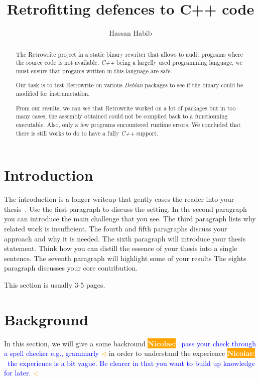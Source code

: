 \documentclass[a4paper,11pt,oneside]{report}
\title{Retrofitting defences to C++ code}
\author{Hassan Habib}
\newcommand{\sysname}{Retrowrite\xspace}
\newcommand{\todobox}[3]{%
    \colorbox{#1}{\textcolor{white}{\sffamily\bfseries\scriptsize #2}}%
    ~\textcolor{blue}{#3} %
    \textcolor{#1}{$\triangleleft$}%
}
\newcommand{\nb}[1]{\todobox{orange}{Nicolas:}{#1}}
\begin{document}
\maketitle

\begin{abstract}
The \sysname project in a static binary rewriter that allows to audit programs where the
source code is not available.
\textit{C++} being a largelly used programming language, we must ensure that
progams written in this language are safe. 

Our task is to test \sysname on various \textit{Debian} packages to see if the
binary could be modified for instrumetation.

From our results, we can see that \sysname worked on a lot of packages but in
too many cases, the assembly obtained could not be compiled back to a
functionning executable. Also, only a few programs encountered runtime errors.
We concluded that there is still works to do to have a fully \textit{C++} support.

\end{abstract}


\maketoc

\chapter{Introduction}

The introduction is a longer writeup that gently eases the reader into your
thesis~\cite{dinesh20oakland}. Use the first paragraph to discuss the setting.
In the second paragraph you can introduce the main challenge that you see.
The third paragraph lists why related work is insufficient.
The fourth and fifth paragraphs discuss your approach and why it is needed.
The sixth paragraph will introduce your thesis statement. Think how you can
distill the essence of your thesis into a single sentence.
The seventh paragraph will highlight some of your results
The eights paragraph discusses your core contribution.

This section is usually 3-5 pages.

\chapter{Background}
In this section, we will give a some backround \nb{pass your check
through a spell checker e.g., grammarly} in order to understand
the experience \nb{the experience is a bit vague. Be clearer in that you want to
build up knowledge for later.}
\end{document}

